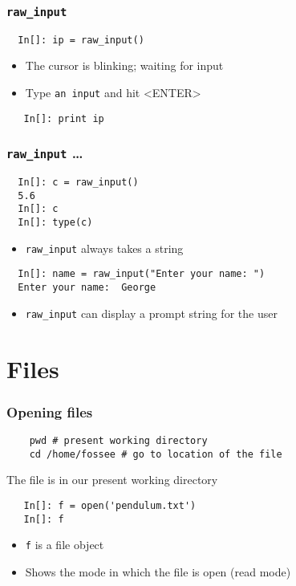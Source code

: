 \begin{frame}[fragile]
  \frametitle{\texttt{raw\_input}}
  \begin{lstlisting}
  In[]: ip = raw_input()    
  \end{lstlisting}
  \begin{itemize}
  \item The cursor is blinking; waiting for input
  \item Type \texttt{an input} and hit <ENTER>
  \end{itemize}
  \begin{lstlisting}
   In[]: print ip
  \end{lstlisting}
\end{frame}

\begin{frame}[fragile]
  \frametitle{\texttt{raw\_input} \ldots}
  \begin{lstlisting}
  In[]: c = raw_input()
  5.6
  In[]: c
  In[]: type(c)
  \end{lstlisting}
  \begin{itemize}
  \item \alert{\texttt{raw\_input} always takes a string}
  \end{itemize}
  \begin{lstlisting}
  In[]: name = raw_input("Enter your name: ")
  Enter your name:  George
  \end{lstlisting}
  \begin{itemize}
  \item \texttt{raw\_input} can display a prompt string for the user
  \end{itemize}
\end{frame}

\section{Files}

\begin{frame}[fragile]
  \frametitle{Opening files}
  \begin{lstlisting}
    pwd # present working directory
    cd /home/fossee # go to location of the file
  \end{lstlisting}
  {\tiny The file is in our present working directory}
  \begin{lstlisting}
   In[]: f = open('pendulum.txt')
   In[]: f
  \end{lstlisting}
  \begin{itemize}
  \item \texttt{f} is a file object
  \item Shows the mode in which the file is open (read mode)
  \end{itemize}
\end{frame}

